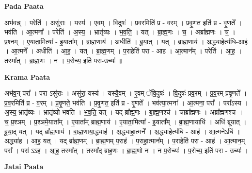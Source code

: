 \documentclass[17pt]{extarticle}
\begin{document}
\textbf{Pada Paata} \newline

अभ॑वन्न् । परेति॑ । असु॑राः । यस्य॑ । ए॒वम् । वि॒दुषः॑ । प्र॒व॒रमिति॑ प्र - व॒रम् । प्र॒वृ॒णत॒ इति॑ प्र - वृ॒णते᳚ । भव॑ति । आ॒त्मना᳚ । परेति॑ । अ॒स्य॒ । भ्रातृ॑व्यः । भ॒व॒ति॒ । यत् । ब्रा॒ह्म॒णः । च॒ । अब्रा᳚ह्मणः । च॒ । प्र॒श्नम् । ए॒याता॒मित्या᳚ - इ॒याता᳚म् । ब्रा॒ह्म॒णाय॑ । अधीति॑ । ब्रू॒या॒त् । यत् । ब्रा॒ह्म॒णाय॑ । अ॒द्ध्याहेत्य॑धि-आह॑ । आ॒त्मने᳚ । अधीति॑ । आ॒ह॒ । यत् । ब्रा॒ह्म॒णम् । प॒राहेति॑ परा - आह॑ । आ॒त्मान᳚म् । परेति॑ । आ॒ह॒ । तस्मा᳚त् । ब्रा॒ह्म॒णः । न । प॒रोच्य॒ इति॑ परा-उच्यः॑ ॥  \newline


\textbf{Krama Paata} \newline

अभ॑व॒न् परा᳚ । परा ऽसु॑राः । असु॑रा॒ यस्य॑ । यस्यै॒वम् । ए॒वम् ॅवि॒दुषः॑ । वि॒दुषः॑ प्रव॒रम् । प्र॒व॒रम् प्र॑वृ॒णते᳚ । प्र॒व॒रमिति॑ प्र - व॒रम् । प्र॒वृ॒णते॒ भव॑ति । प्र॒वृ॒णत॒ इति॑ प्र - वृ॒णते᳚ । भव॑त्या॒त्मना᳚ । आ॒त्मना॒ परा᳚ । परा᳚ऽस्य । अ॒स्य॒ भ्रातृ॑व्यः । भ्रातृ॑व्यो भवति । भ॒व॒ति॒ यत् । यद् ब्रा᳚ह्म॒णः । बा॒ह्म॒णश्च॑ । चाब्रा᳚ह्मणः । अब्रा᳚ह्मणश्च । च॒ प्र॒श्ञम् । प्र॒श्ञमे॒याता᳚म् । ए॒याता᳚म् ब्राह्म॒णाय॑ । ए॒याता॒मित्या᳚ - इ॒याता᳚म् । ब्रा॒ह्म॒णायाधि॑ । अधि॑ ब्रूयात् । ब्रू॒या॒द् यत् । यद् ब्रा᳚ह्म॒णाय॑ । बा॒ह्म॒णाया॒द्ध्याह॑ । अ॒द्ध्याहा॒त्मने᳚ । अ॒द्ध्याहेत्य॑धि - आह॑ । आ॒त्मनेऽधि॑ । अद्ध्या॑ह । आ॒ह॒ यत् । यद् ब्रा᳚ह्म॒णम् । ब्रा॒ह्म॒णम् प॒राह॑ । प॒राहा॒त्मान᳚म् । प॒राहेति॑ परा - आह॑ । आ॒त्मान॒म् परा᳚ । परा॑ ऽऽह । आ॒ह॒ तस्मा᳚त् । तस्मा᳚द् ब्राह॒णः । ब्रा॒ह्म॒णो न । न प॒रोच्यः॑ । प॒रोच्य॒ इति॑ परा - उच्यः॑ । \newline

\textbf{Jatai Paata} \newline
\end{document}
